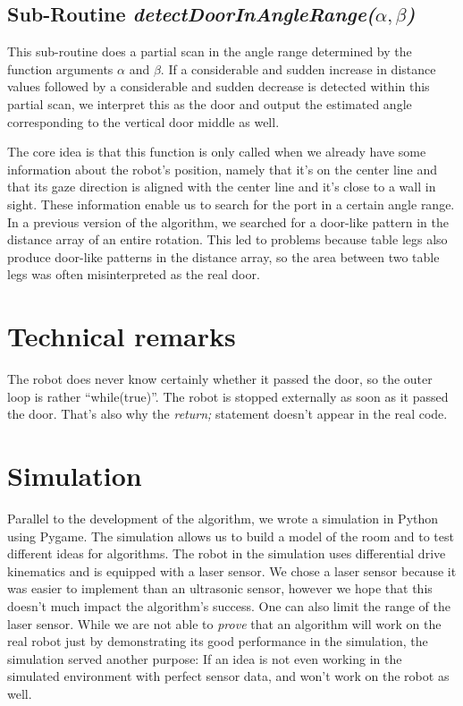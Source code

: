 \documentclass{article}
\begin{document}
\subsection{Sub-Routine \textit{detectDoorInAngleRange($\alpha, \beta$)}}
This sub-routine does a partial scan in the angle range determined by the function arguments
$\alpha$ and $\beta$. 
If a considerable and sudden increase in distance values followed by a considerable and sudden decrease is 
detected within this partial scan, we interpret this as the door and output the estimated angle corresponding to the vertical door middle as well.
 
The core idea is that this function is only called when we already have some information about 
the robot's position, namely that it's on the center line and that its gaze direction is aligned
with the center line and it's close to a wall in sight.
These information enable us to search for the port in a certain angle range.
In a previous version of the algorithm, we searched for a door-like pattern in the distance array of an entire rotation.
This led to problems because table legs also produce door-like patterns in the distance array, so the area between two table legs was often misinterpreted as the real door.

\section{Technical remarks}
The robot does never know certainly whether it passed the door, so the outer loop is rather \enquote{while(true)}. The robot is stopped externally as soon as it passed the door.
That's also why the \textit{return;} statement doesn't appear in the real code.

\section{Simulation}
Parallel to the development of the algorithm, we wrote a simulation in Python using Pygame.
The simulation allows us to build a model of the room and to test different ideas for algorithms.
The robot in the simulation uses differential drive kinematics and is equipped with a laser sensor.
We chose a laser sensor because it was easier to implement than an ultrasonic sensor,
however we hope that this doesn't much impact the algorithm's success.
One can also limit the range of the laser sensor.
While we are not able to \textit{prove} that an algorithm will work on the real robot just by
demonstrating its good performance in the simulation, the simulation served another purpose:
If an idea is not even working in the simulated environment with perfect sensor data,
and won't work on the robot as well.
\end{document}
